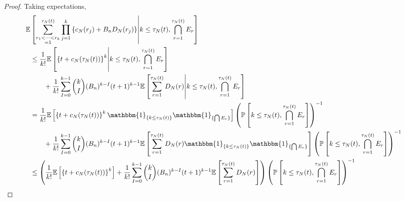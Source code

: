 \documentclass{article}
\newcommand{\Prob}{\mathbb{P}}
\newcommand{\E}{\mathbb{E}}
\newcommand{\I}[1]{\mathbbm{1}_{\{#1\}}}
\newcommand{\1}[1]{\mathbbm{1}_{#1}}
\begin{document}
\begin{proof}
Taking expectations, 
\begin{align}
\E &\left[ \sum_{\substack{r_1<\dots<r_k \\ =1}}^{\tau_N(t)}\prod_{j=1}^k 
\left\{ c_N(r_j) + B_n D_N(r_j) \right\} 
\middle| k\leq\tau_N(t), \bigcap_{r=1}^{\tau_N(t)} E_r \right] \notag\\
&\leq \frac{1}{k!} \E \left[ \left\{ t + c_N(\tau_N(t)) \right\}^k
\middle| k\leq\tau_N(t), \bigcap_{r=1}^{\tau_N(t)} E_r \right] \notag\\
&\qquad+ \frac{1}{k!}
\sum_{I=0}^{k-1}  \binom{k}{I}
( B_n )^{k-I}
(t+1)^{k-1}
\E\left[ \sum_{r=1}^{\tau_N(t)} D_N(r) \middle| k\leq\tau_N(t), \bigcap_{r=1}^{\tau_N(t)} E_r \right] \notag\\
&= \frac{1}{k!} \E \left[ \left\{ t + c_N(\tau_N(t)) \right\}^k
\I{k\leq\tau_N(t)} \I{\bigcap E_r} \right] 
\left(\Prob \left[k\leq\tau_N(t), \bigcap_{r=1}^{\tau_N(t)} E_r \right] \right)^{-1} \notag\\
&\qquad+ \frac{1}{k!}
\sum_{I=0}^{k-1}  \binom{k}{I}
( B_n )^{k-I}
(t+1)^{k-1}
\E\left[ \sum_{r=1}^{\tau_N(t)} D_N(r) \I{k\leq\tau_N(t)} \I{\bigcap E_r} \right]
\left(\Prob \left[k\leq\tau_N(t), \bigcap_{r=1}^{\tau_N(t)} E_r \right] \right)^{-1} \notag\\
& \leq \left(
\frac{1}{k!} \E \left[ \left\{ t + c_N(\tau_N(t)) \right\}^k \right] 
+ \frac{1}{k!}
\sum_{I=0}^{k-1}  \binom{k}{I}
( B_n )^{k-I}
(t+1)^{k-1}
\E\left[ \sum_{r=1}^{\tau_N(t)} D_N(r) \right]
\right)
\left(\Prob \left[k\leq\tau_N(t), \bigcap_{r=1}^{\tau_N(t)} E_r \right] \right)^{-1} \notag\\

\end{align}
\end{proof}
\end{document}
